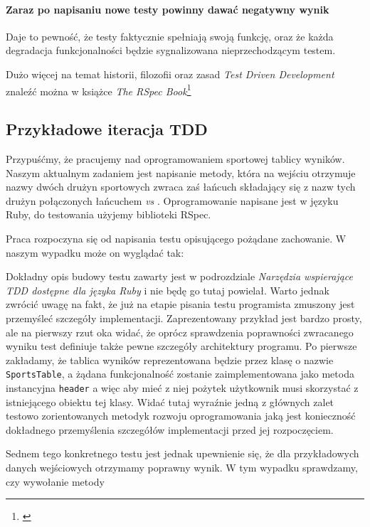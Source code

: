     \paragraph{Zaraz po napisaniu nowe testy powinny dawać negatywny wynik}
      Daje to pewność, że testy faktycznie spełniają swoją funkcję, oraz że każda degradacja funkcjonalności będzie sygnalizowana nieprzechodzącym testem.
      
      Dużo więcej na temat historii, filozofii oraz zasad \emph{Test Driven Development} znaleźć można w książce \emph{The RSpec Book}\footnote{\cite{rspec_book}}
      
  \subsection{Przykładowe iteracja TDD}
    Przypuśćmy, że pracujemy nad oprogramowaniem sportowej tablicy wyników. Naszym aktualnym zadaniem jest napisanie metody, która na wejściu otrzymuje nazwy dwóch drużyn sportowych zwraca zaś łańcuch składający się z nazw tych drużyn połączonych łańcuchem \emph{ vs }. Oprogramowanie napisane jest w języku Ruby, do testowania użyjemy biblioteki RSpec.
    
    Praca rozpoczyna się od napisania testu opisującego pożądane zachowanie. W naszym wypadku może on wyglądać tak: 
    
    

    Dokładny opis budowy testu zawarty jest w podrozdziale \emph{Narzędzia wspierające TDD dostępne dla języka Ruby} i nie będę go tutaj powielał. Warto jednak zwrócić uwagę na fakt, że już na etapie pisania testu programista zmuszony jest przemyśleć szczegóły implementacji. Zaprezentowany przykład jest bardzo prosty, ale na pierwszy rzut oka widać, że oprócz sprawdzenia poprawności zwracanego wyniku test definiuje także pewne szczegóły architektury programu. Po pierwsze zakładamy, że tablica wyników reprezentowana będzie przez klasę o nazwie \texttt{SportsTable}, a żądana funkcjonalność zostanie zaimplementowana jako metoda instancyjna \texttt{header} a więc aby mieć z niej pożytek użytkownik musi skorzystać z istniejącego obiektu tej klasy. Widać tutaj wyraźnie jedną z głównych zalet testowo zorientowanych metodyk rozwoju oprogramowania jaką jest konieczność dokładnego przemyślenia szczegółów implementacji przed jej rozpoczęciem.
    
    Sednem tego konkretnego testu jest jednak upewnienie się, że dla przykładowych danych wejściowych otrzymamy poprawny wynik. W tym wypadku sprawdzamy, czy wywołanie metody 
    
